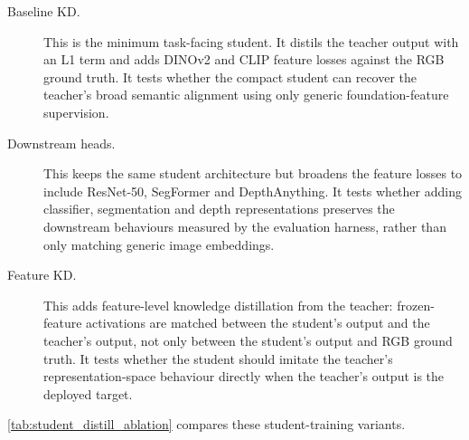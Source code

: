 \begin{description}
    \item[Baseline KD.] This is the minimum task-facing student. It distils the teacher output with an L1 term and adds DINOv2 and CLIP feature losses against the RGB ground truth. It tests whether the compact student can recover the teacher's broad semantic alignment using only generic foundation-feature supervision.
    \item[Downstream heads.] This keeps the same student architecture but broadens the feature losses to include ResNet-50, SegFormer and DepthAnything. It tests whether adding classifier, segmentation and depth representations preserves the downstream behaviours measured by the evaluation harness, rather than only matching generic image embeddings.
    \item[Feature KD.] This adds feature-level knowledge distillation from the teacher: frozen-feature activations are matched between the student's output and the teacher's output, not only between the student's output and RGB ground truth. It tests whether the student should imitate the teacher's representation-space behaviour directly when the teacher's output is the deployed target.
\end{description}

\autoref{tab:student_distill_ablation} compares these student-training variants.

\begin{table}[!htbp]
\centering
\footnotesize
\setlength{\tabcolsep}{3pt}
\caption{Student distillation ablation for the width-16 NAFNet. All variants use 1.7\,M parameters and the same backbone, and only the auxiliary supervision differs. YOLO and RT-DETR columns report mAP@0.5 agreement.}
\label{tab:student_distill_ablation}
\end{table}

